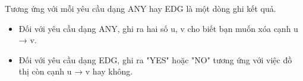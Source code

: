 Tương ứng với mỗi yêu cầu dạng ANY hay EDG là một dòng ghi kết quả.  
\begin{itemize}
	\item     Đối với yêu cầu dạng ANY, ghi ra hai số u, v cho biết bạn muốn xóa cạnh u → v.   
	\item     Đối với yêu cầu dạng EDG, ghi ra "YES" hoặc "NO" tương ứng với việc đồ thị còn cạnh u → v hay không.   
\end{itemize}